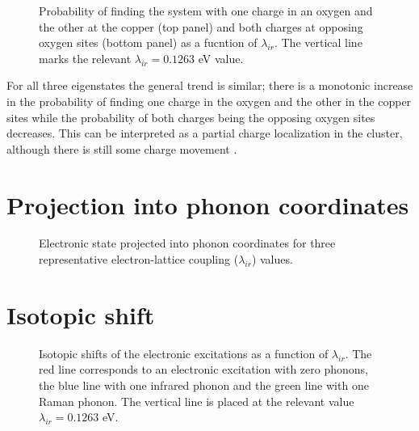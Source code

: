 \begin{figure}[ht]
  \centering
  
  \caption[Probability of finding the system with one charge in an oxygen and the other at the copper and both charges at opposing oxygen sites.]
  {Probability of finding the system with one charge in an oxygen and the other at the copper (top panel) and both charges at opposing oxygen sites (bottom panel) as a fucntion of $\lambda_{ir}$.
  The vertical line marks the relevant $\lambda_{ir}=0.1263$ eV value.}
  \label{fig:electronicOccupations}
\end{figure}

For all three eigenstates the general trend is similar; there is a monotonic increase in the probability of finding one charge in the oxygen and the other in the copper sites while the probability of both charges being the opposing oxygen sites decreases.
This can be interpreted as a partial charge localization in the cluster, although there is still some charge movement \cite{GarciaSaraviaOrtizdeMontellano2013}.

\section{Projection into phonon coordinates}

\begin{figure}[ht]
  \centering
  
  \caption{Electronic state projected into phonon coordinates for three representative electron-lattice coupling ($\lambda_{ir}$) values.}
  \label{fig:phononProjElectr}
\end{figure}

\section{Isotopic shift}

\begin{figure}[ht]
  \centering
  
  \caption[Isotopic shift of the electronic excitations as a function of $\lambda_{ir}$.]
  {Isotopic shifts of the electronic excitations as a function of $\lambda_{ir}$. 
    The red line corresponds to an electronic excitation with zero phonons, the blue line with one infrared phonon and the green line with one Raman phonon.
    The vertical line is placed at the relevant value $\lambda_{ir}=0.1263$ eV.}
  \label{fig:electrIsot}
\end{figure}

